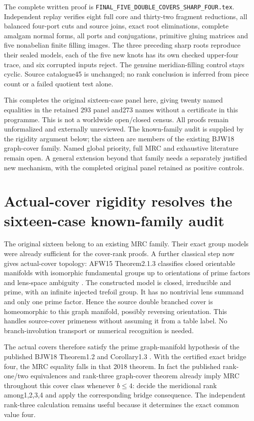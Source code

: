 \documentclass[11pt]{article}
\begin{document}
The complete written proof is
\texttt{FINAL\_FIVE\_DOUBLE\_COVERS\_SHARP\_FOUR.tex}.
Independent replay verifies eight full core and thirty-two fragment
reductions, all balanced four-port cuts and source joins, exact root
eliminations, complete amalgam normal forms, all ports and conjugations,
primitive gluing matrices and five nonabelian finite filling images.
The three preceding sharp roots reproduce their sealed models, each
of the five new knots has its own checked upper-four trace, and six
corrupted inputs reject. The genuine meridian-filling control stays
cyclic. Source catalogue45 is unchanged; no rank conclusion is inferred
from piece count or a failed quotient test alone.

This completes the original sixteen-case panel here, giving twenty
named equalities in the retained $293$ panel and273 names without a
certificate in this programme. This is not a worldwide open/closed
census. All proofs remain unformalized and externally unreviewed. The
known-family audit is supplied by the rigidity argument below; the
sixteen are members of the existing BJW18 graph-cover family. Named global
priority, full MRC and exhaustive literature remain open. A general
extension beyond that family needs a separately justified new mechanism,
with the completed original panel retained as positive controls.

\section{Actual-cover rigidity resolves the sixteen-case known-family audit}

The original sixteen belong to an existing MRC family. Their exact group
models were already sufficient for the cover-rank proofs. A further
classical step now gives actual-cover topology: AFW15
Theorem2.1.3 classifies closed orientable manifolds with isomorphic
fundamental groups up to orientations of prime factors and lens-space
ambiguity \cite{afw}. The constructed model is closed, irreducible and
prime, with an infinite injected trefoil group. It has no nontrivial lens
summand and only one prime factor. Hence the source double branched cover
is homeomorphic to this graph manifold, possibly reversing orientation.
This handles source-cover primeness without assuming it from a table
label. No branch-involution transport or numerical recognition is needed.

The actual covers therefore satisfy the prime graph-manifold hypothesis
of the published BJW18 Theorem1.2 and Corollary1.3 \cite{bjw}.
With the certified exact bridge four, the MRC equality falls in that
2018 theorem. In fact the published rank-one/two equivalences and rank-three
graph-cover theorem already imply MRC throughout this cover class whenever
$b\le4$: decide the meridional rank among1,2,3,4 and apply the corresponding
bridge consequence. The independent rank-three calculation remains useful
because it determines the exact common value four.
\end{document}
